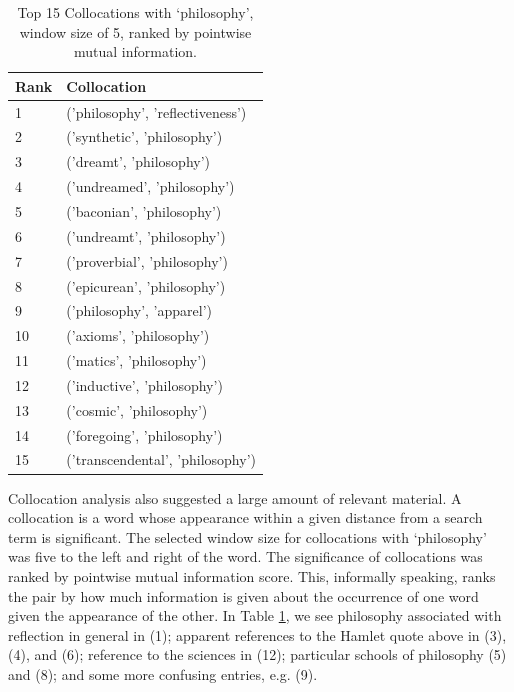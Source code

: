 \documentclass{article}
\begin{document}
\begin{table}[]
        \footnotesize
        \centering
        \begin{tabular}{l|l}
          Rank & Collocation  \\
          \hline
        1 & ('philosophy', 'reflectiveness') \\
        2 & ('synthetic', 'philosophy') \\
        3 & ('dreamt', 'philosophy') \\
        4 & ('undreamed', 'philosophy') \\
        5 & ('baconian', 'philosophy') \\
        6 & ('undreamt', 'philosophy') \\
        7 & ('proverbial', 'philosophy') \\
        8 & ('epicurean', 'philosophy') \\
        9 & ('philosophy', 'apparel') \\
        10 & ('axioms', 'philosophy') \\
        11 & ('matics', 'philosophy') \\
        12 & ('inductive', 'philosophy') \\
        13 & ('cosmic', 'philosophy') \\
        14 & ('foregoing', 'philosophy') \\
        15 & ('transcendental', 'philosophy') \\
        \end{tabular}
        \caption{Top 15 Collocations with `philosophy', window size of 5, ranked by pointwise mutual information.}
        \label{t:corpus-collocation}
\end{table}

Collocation analysis also suggested a large amount of relevant material. A collocation is a word whose appearance within a given distance from a search term is significant. The selected window size for collocations with `philosophy' was five to the left and right of the word. The significance of  collocations was ranked by pointwise mutual information score. This, informally speaking, ranks the pair by how much information is given about the occurrence of one word given the appearance of the other. In Table \ref{t:corpus-collocation}, we see philosophy associated with reflection in general in (1); apparent references to the Hamlet quote above in (3), (4), and (6); reference to the sciences in (12); particular schools of philosophy (5) and (8); and some more confusing entries, e.g. (9).
\end{document}
